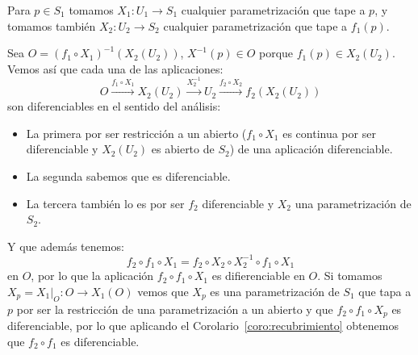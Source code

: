 \begin{ejercicio}
\begin{enumerate}
\begin{itemize}
                    Para $p\in S_1$ tomamos $X_1:U_1\to S_1$ cualquier parametrización que tape a $p$, y tomamos también $X_2:U_2\to S_2$ cualquier parametrización que tape a $f_1(p)$.
                    \begin{figure}[H]
                        \centering
                    \end{figure}
                    \noindent
                    Sea $O = {(f_1\circ X_1)}^{-1}(X_2(U_2))$, $X^{-1}(p)\in O$ porque $f_1(p)\in X_2(U_2)$. Vemos así que cada una de las aplicaciones:
                    \begin{equation*}
                        O \stackrel{f_1\circ X_1}{\longrightarrow} X_2(U_2) \stackrel{X_2^{-1}}{\longrightarrow} U_2 \stackrel{f_2\circ X_2}{\longrightarrow} f_2(X_2(U_2))
                    \end{equation*}
                    son diferenciables en el sentido del análisis:
                    \begin{itemize}
                        \item La primera por ser restricción a un abierto ($f_1\circ X_1$ es continua por ser diferenciable y $X_2(U_2)$ es abierto de $S_2$) de una aplicación diferenciable.
                        \item La segunda sabemos que es diferenciable.
                        \item La tercera también lo es por ser $f_2$ diferenciable y $X_2$ una parametrización de $S_2$.
                    \end{itemize}
                    Y que además tenemos:
                    \begin{equation*}
                        f_2\circ f_1\circ X_1 = f_2\circ X_2\circ X_2^{-1}\circ f_1\circ X_1
                    \end{equation*}
                    en $O$, por lo que la aplicación $f_2\circ f_1\circ X_1$ es difierenciable en $O$. Si tomamos $X_p = X_1\big|_O:O\to X_1(O)$ vemos que $X_p$ es una parametrización de $S_1$ que tapa a $p$ por ser la restricción de una parametrización a un abierto y que $f_2\circ f_1\circ X_p$ es diferenciable, por lo que aplicando el Corolario~\ref{coro:recubrimiento} obtenemos que $f_2\circ f_1$ es diferenciable.

\end{itemize}
\end{enumerate}
\end{ejercicio}
